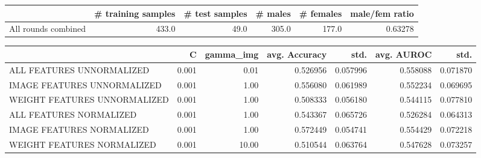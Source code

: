 \begin{tabular}{lrrrrr}
\hline
{} &  \# training samples &  \# test samples &  \# males &  \# females &  male/fem ratio \\
\hline
All rounds combined &               433.0 &            49.0 &    305.0 &      177.0 &         0.63278 \\
\hline
\end{tabular}
\begin{tabular}{lrrrrrr}
\hline
{} &      C &  gamma\_img &  avg. Accuracy &      std. &  avg. AUROC &      std. \\
\hline
ALL FEATURES UNNORMALIZED    &  0.001 &       0.01 &       0.526956 &  0.057996 &    0.558088 &  0.071870 \\
IMAGE FEATURES UNNORMALIZED  &  0.001 &       1.00 &       0.556080 &  0.061989 &    0.552234 &  0.069695 \\
WEIGHT FEATURES UNNORMALIZED &  0.001 &       1.00 &       0.508333 &  0.056180 &    0.544115 &  0.077810 \\
ALL FEATURES NORMALIZED      &  0.001 &       1.00 &       0.543367 &  0.065726 &    0.526284 &  0.064313 \\
IMAGE FEATURES NORMALIZED    &  0.001 &       1.00 &       0.572449 &  0.054741 &    0.554429 &  0.072218 \\
WEIGHT FEATURES NORMALIZED   &  0.001 &      10.00 &       0.510544 &  0.063764 &    0.547628 &  0.073257 \\
\hline
\end{tabular}
